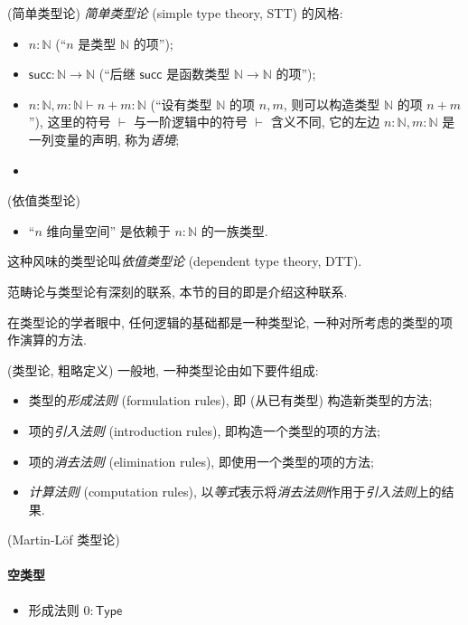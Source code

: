 \begin{example}
	{(简单类型论)}
	\emph{简单类型论} (simple type theory, STT) 的风格:
	\begin{itemize}
		\item $n\colon \mathbb{N}$ (``$n$ 是类型 $\mathbb{N}$ 的项'');
		\item $\mathsf {succ}\colon \mathbb{N}\to\mathbb{N}$ (``后继 $\mathsf {succ}$ 是函数类型 $\mathbb{N}\to\mathbb{N}$ 的项'');
		\item $n\colon \mathbb{N},m\colon \mathbb{N} \vdash n+m \colon \mathbb{N}$ (``设有类型 $\mathbb{N}$ 的项 $n,m$, 则可以构造类型 $\mathbb{N}$ 的项 $n+m$''), 这里的符号 $\vdash$ 与一阶逻辑中的符号 $\vdash$ 含义不同, 它的左边 $n\colon \mathbb{N},m\colon \mathbb{N}$ 是一列变量的声明, 称为\emph{语境};
		\item
	\end{itemize}
	
\end{example}

\begin{example}
	{(依值类型论)}
	\begin{itemize}
		\item ``$n$ 维向量空间'' 是依赖于 $n\colon \mathbb{N}$ 的一族类型. 
	\end{itemize}
	这种风味的类型论叫\emph{依值类型论} (dependent type theory, DTT).
\end{example}

范畴论与类型论有深刻的联系, 本节的目的即是介绍这种联系.

在类型论的学者眼中, 任何逻辑的基础都是一种类型论, 一种对所考虑的类型的项作演算的方法.

\begin{definition}
	{(类型论, 粗略定义)}
	一般地, 一种类型论由如下要件组成:
	\begin{itemize}
		\item 类型的\emph{形成法则} (formulation rules), 即 (从已有类型) 构造新类型的方法;
		\item 项的\emph{引入法则} (introduction rules), 即构造一个类型的项的方法;
		\item 项的\emph{消去法则} (elimination rules), 即使用一个类型的项的方法;
		\item \emph{计算法则} (computation rules), 以\emph{等式}表示将\emph{消去法则}作用于\emph{引入法则}上的结果.
	\end{itemize}
\end{definition}

\begin{example}
	{(Martin-L\"of 类型论)}
	\paragraph{空类型}
	\begin{itemize}
		\item 形成法则 $0\colon \mathsf {Type}$
	\end{itemize}
	
	\paragraph{}
\end{example}

